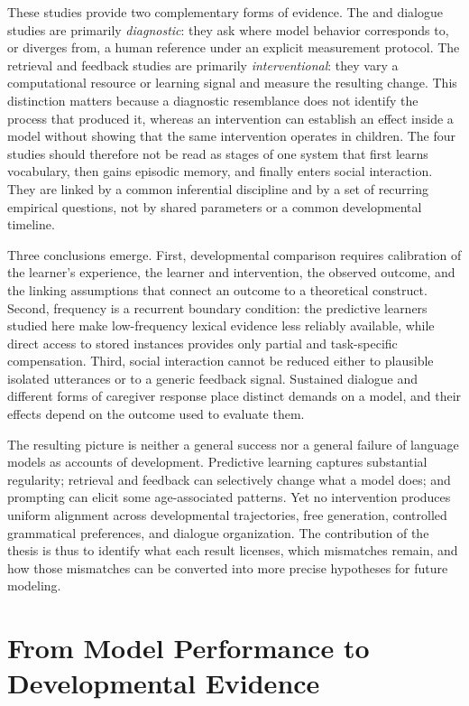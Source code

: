 These studies provide two complementary forms of evidence. The \meCDI{} and dialogue studies are primarily \emph{diagnostic}: they ask where model behavior corresponds to, or diverges from, a human reference under an explicit measurement protocol. The retrieval and feedback studies are primarily \emph{interventional}: they vary a computational resource or learning signal and measure the resulting change. This distinction matters because a diagnostic resemblance does not identify the process that produced it, whereas an intervention can establish an effect inside a model without showing that the same intervention operates in children. The four studies should therefore not be read as stages of one system that first learns vocabulary, then gains episodic memory, and finally enters social interaction. They are linked by a common inferential discipline and by a set of recurring empirical questions, not by shared parameters or a common developmental timeline.

Three conclusions emerge. First, developmental comparison requires calibration of the learner's experience, the learner and intervention, the observed outcome, and the linking assumptions that connect an outcome to a theoretical construct. Second, frequency is a recurrent boundary condition: the predictive learners studied here make low-frequency lexical evidence less reliably available, while direct access to stored instances provides only partial and task-specific compensation. Third, social interaction cannot be reduced either to plausible isolated utterances or to a generic feedback signal. Sustained dialogue and different forms of caregiver response place distinct demands on a model, and their effects depend on the outcome used to evaluate them.

The resulting picture is neither a general success nor a general failure of language models as accounts of development. Predictive learning captures substantial regularity; retrieval and feedback can selectively change what a model does; and prompting can elicit some age-associated patterns. Yet no intervention produces uniform alignment across developmental trajectories, free generation, controlled grammatical preferences, and dialogue organization. The contribution of the thesis is thus to identify what each result licenses, which mismatches remain, and how those mismatches can be converted into more precise hypotheses for future modeling.

\section{From Model Performance to Developmental Evidence}
\label{sec:gd_calibration}

